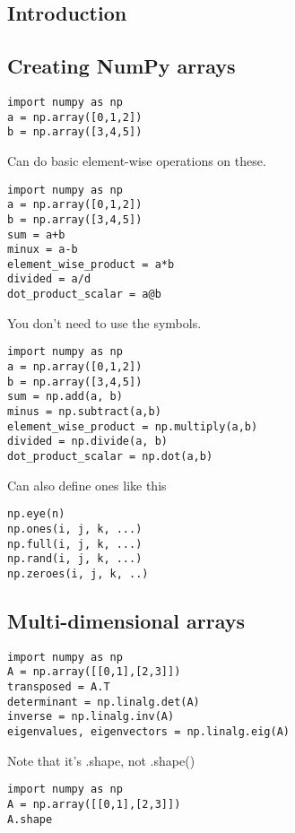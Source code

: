 
\subsection{Introduction}


\subsection{Creating NumPy arrays}

\begin{verbatim}
import numpy as np
a = np.array([0,1,2])
b = np.array([3,4,5])
\end{verbatim}

Can do basic element-wise operations on these.

\begin{verbatim}
import numpy as np
a = np.array([0,1,2])
b = np.array([3,4,5])
sum = a+b
minux = a-b
element_wise_product = a*b
divided = a/d
dot_product_scalar = a@b
\end{verbatim}

You don't need to use the symbols.

\begin{verbatim}
import numpy as np
a = np.array([0,1,2])
b = np.array([3,4,5])
sum = np.add(a, b)
minus = np.subtract(a,b)
element_wise_product = np.multiply(a,b)
divided = np.divide(a, b)
dot_product_scalar = np.dot(a,b)
\end{verbatim}

Can also define ones like this

\begin{verbatim}
np.eye(n)
np.ones(i, j, k, ...)
np.full(i, j, k, ...)
np.rand(i, j, k, ...)
np.zeroes(i, j, k, ..)
\end{verbatim}
\subsection{Multi-dimensional arrays}

\begin{verbatim}
import numpy as np
A = np.array([[0,1],[2,3]])
transposed = A.T
determinant = np.linalg.det(A)
inverse = np.linalg.inv(A)
eigenvalues, eigenvectors = np.linalg.eig(A)

\end{verbatim}

Note that it's .shape, not .shape()

\begin{verbatim}
import numpy as np
A = np.array([[0,1],[2,3]])
A.shape
\end{verbatim}


